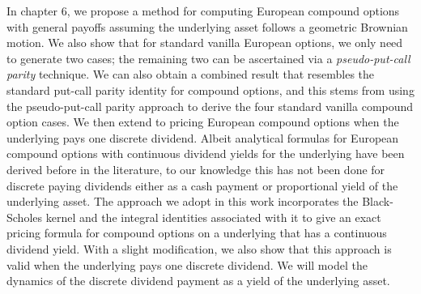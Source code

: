 		In chapter 6, we propose a method for computing European compound options with general payoffs assuming the underlying asset follows a geometric Brownian motion. We also show that for standard vanilla European options, we only need to generate two cases; the remaining two can be ascertained via a \emph{pseudo-put-call parity} technique. We can also obtain a combined result that resembles the standard put-call parity identity for compound options, and this stems from using the pseudo-put-call parity approach to derive the four standard vanilla compound option cases. We then extend to pricing European compound options when the underlying pays one discrete dividend. Albeit analytical formulas for European compound options with continuous dividend yields for the underlying have been derived before in the literature, to our knowledge this has not been done for discrete paying dividends either as a cash payment or proportional yield of the underlying asset. The approach we adopt in this work incorporates the Black-Scholes kernel and the integral identities associated with it to give an exact pricing formula for compound options on a underlying that has a continuous dividend yield. With a slight modification, we also show that this approach is valid when the underlying pays one discrete dividend. We will model the dynamics of the discrete dividend payment as a yield of the underlying asset.
